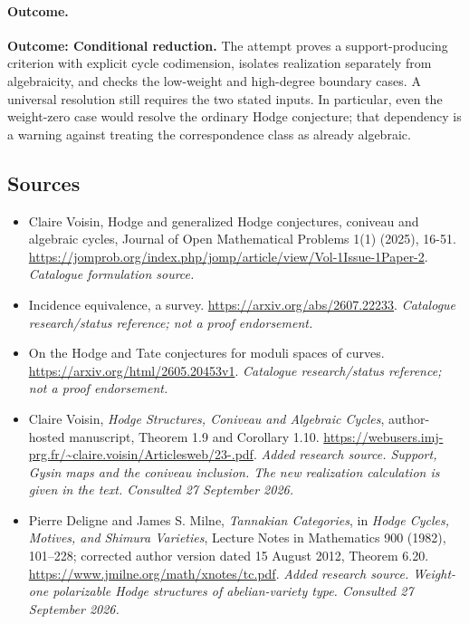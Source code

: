\documentclass[11pt,a4paper]{article}
\begin{document}
\paragraph{Outcome.}
\textbf{Outcome: Conditional reduction.}
The attempt proves a support-producing criterion with explicit cycle
codimension, isolates realization separately from algebraicity, and checks
the low-weight and high-degree boundary cases. A universal resolution
still requires the two stated inputs. In particular, even the weight-zero
case would resolve the ordinary Hodge conjecture; that dependency is a
warning against treating the correspondence class as already algebraic.
\subsection{Sources}
\begin{itemize}\raggedright
\item[\textnormal{[S1]}]\hypertarget{source:30000968:1}{} Claire Voisin, Hodge and generalized Hodge conjectures, coniveau and algebraic cycles, Journal of Open Mathematical Problems 1(1) (2025), 16-51.
\url{https://jomprob.org/index.php/jomp/article/view/Vol-1Issue-1Paper-2}.
{\small\textit{Catalogue formulation source.}}
\item[\textnormal{[S2]}]\hypertarget{source:30000968:2}{} Incidence equivalence, a survey.
\url{https://arxiv.org/abs/2607.22233}.
{\small\textit{Catalogue research/status reference; not a proof endorsement.}}
\item[\textnormal{[S3]}]\hypertarget{source:30000968:3}{} On the Hodge and Tate conjectures for moduli spaces of curves.
\url{https://arxiv.org/html/2605.20453v1}.
{\small\textit{Catalogue research/status reference; not a proof endorsement.}}
\item[\textnormal{[E1]}]\hypertarget{extra:30000968:1}{} Claire Voisin, \emph{Hodge Structures, Coniveau and Algebraic Cycles}, author-hosted manuscript, Theorem 1.9 and Corollary 1.10.
\url{https://webusers.imj-prg.fr/~claire.voisin/Articlesweb/23-.pdf}.
{\small\textit{Added research source. Support, Gysin maps and the coniveau inclusion. The new realization calculation is given in the text. Consulted 27 September 2026.}}
\item[\textnormal{[E2]}]\hypertarget{extra:30000968:2}{} Pierre Deligne and James S. Milne, \emph{Tannakian Categories}, in \emph{Hodge Cycles, Motives, and Shimura Varieties}, Lecture Notes in Mathematics 900 (1982), 101--228; corrected author version dated 15 August 2012, Theorem 6.20.
\url{https://www.jmilne.org/math/xnotes/tc.pdf}.
{\small\textit{Added research source. Weight-one polarizable Hodge structures of abelian-variety type. Consulted 27 September 2026.}}
\end{itemize}

\end{document}
